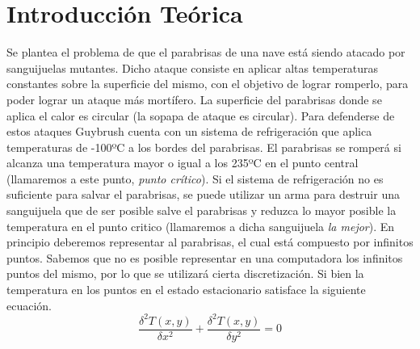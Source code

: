 \section{Introducción Teórica}
%


Se plantea el problema de que el parabrisas de una nave está siendo atacado por sanguijuelas mutantes. Dicho ataque consiste en aplicar altas temperaturas constantes sobre la superficie del mismo, con el objetivo de lograr romperlo, para poder lograr un ataque más mortífero. La superficie del parabrisas donde se aplica el calor es circular (la sopapa de ataque es circular). \newline
Para defenderse de estos ataques Guybrush cuenta con un sistema de refrigeración que aplica temperaturas de -100ºC a los bordes del parabrisas. El parabrisas se romperá si alcanza una temperatura mayor o igual a los 235ºC en el punto central (llamaremos a este punto, \textit{punto crítico}).\newline
Si el sistema de refrigeración no es suficiente para salvar el parabrisas, se puede utilizar un arma para destruir una sanguijuela que de ser posible salve el parabrisas y reduzca lo mayor posible la temperatura en el punto critico (llamaremos a dicha sanguijuela \textit{la mejor}). 
En principio deberemos representar al parabrisas, el cual está compuesto por infinitos puntos. Sabemos que no es posible representar en una computadora los infinitos puntos del mismo, por lo que se utilizará cierta discretización.
Si bien la temperatura en los puntos en el estado estacionario satisface la siguiente ecuación.\\

\begin{equation}
\frac{\delta ^2 T(x,y)}{\delta x^2}+\frac{\delta ^2 T(x,y)}{\delta y^2}=0 
\end{equation}\\

